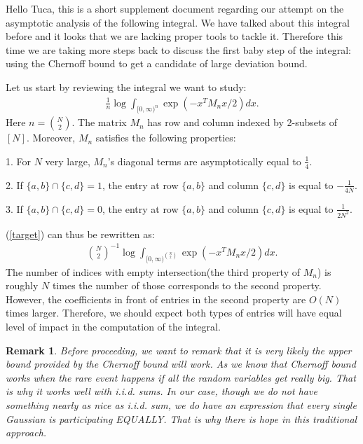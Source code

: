 \documentclass[10pt]{article}
\author{Yi Gu}
\newtheorem{remark}{\bf Remark}
\newenvironment{Proof of lemma}{\noindent{\bf Proof of Lemma}}{\hfill$\Box$\newline}
\newenvironment{Proof of claim}{\noindent{\bf Proof of claim}}{\hfill$\Box$\newline}
\newenvironment{Proof of theorem}{\noindent{\bf Proof of Theorem}}{\hfill\scriptsize{$\Box$}\newline}
\newenvironment{Proof of theorems}{\noindent{\bf Proof of Theorems}}{\hfill$\Box$\newline}
\newenvironment{Proof of proposition}{\noindent{\bf Proof of Proposition}}{\hfill$\Box$\newline}
\newenvironment{Proof of propositions}{\noindent{\bf Proof of Propositions}}{\hfill$\Box$\newline}
\newenvironment{Proof of exercise}{\noindent{\it Proof of Exercise:}}{\hfill$\Box$}
\begin{document}
Hello Tuca, this is a short supplement document regarding our attempt on the asymptotic analysis of the following integral. We have talked about this integral before and it looks that we are lacking proper tools to tackle it. Therefore this time we are taking more steps back to discuss the first baby step of the integral: using the Chernoff bound to get a candidate of large deviation bound.

Let us start by reviewing the integral we want to study:
\begin{align} \label{target}
    \frac{1}{n}\log \int_{[0,\infty)^n} \exp \left(-x^T M_n x/2\right)dx.
\end{align}
Here $n = \binom{N}{2}$. The matrix $M_n$ has row and column indexed by 2-subsets of $[N]$. Moreover, $M_n$ satisfies the following properties:

1. For $N$ very large, $M_n$'s diagonal terms are asymptotically equal to $\frac{1}{4}$.

2. If $\{a,b\} \cap \{c,d\} = 1$, the entry at row $\{a,b\}$ and column $\{c,d\}$ is equal to $-\frac{1}{4N}$.

3. If $\{a,b\} \cap \{c,d\} = 0$, the entry at row $\{a,b\}$ and column $\{c,d\}$ is equal to $\frac{1}{2N^2}$.

(\ref{target}) can thus be rewritten as:
\begin{align}
    \binom{N}{2}^{-1}\log \int_{[0,\infty)^{\binom{N}{2}}} \exp \left(-x^T M_n x/2\right)dx.
\end{align}
The number of indices with empty intersection(the third property of $M_n$) is roughly $N$ times the number of those corresponds to the second property. However, the coefficients in front of entries in the second property are $O(N)$ times larger. Therefore, we should expect both types of entries will have equal level of impact in the computation of the integral.

\begin{remark}
    Before proceeding, we want to remark that it is very likely the upper bound provided by the Chernoff bound will work. As we know that Chernoff bound works when the rare event happens if all the random variables get really big. That is why it works well with i.i.d. sums. In our case, though we do not have something nearly as nice as i.i.d. sum, we do have an expression that every single Gaussian is participating EQUALLY. That is why there is hope in this traditional approach.
\end{remark}
\end{document}
